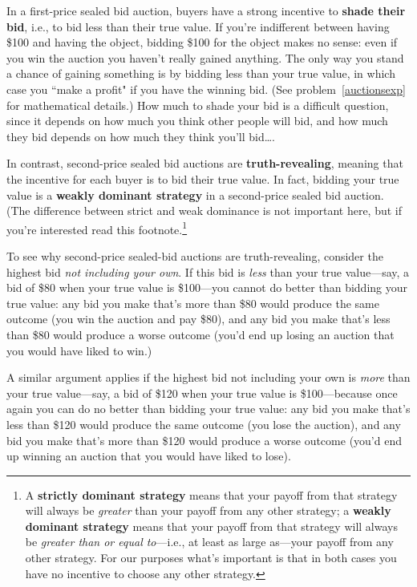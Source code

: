 In a first-price sealed bid auction, buyers have a strong incentive to \textbf{shade their bid}, i.e., to bid less than their true value. If you're indifferent between having \$100 and having the object, bidding \$100 for the object makes no sense: even if you win the auction you haven't really gained anything. The only way you stand a chance of gaining something is by bidding less than your true value, in which case you ``make a profit" if you have the winning bid. (See problem~\ref{auctionsexp} for mathematical details.) How much to shade your bid is a difficult question, since it depends on how much you think other people will bid, and how much they bid depends on how much they think you'll bid\ldots.

In contrast, second-price sealed bid auctions are \textbf{truth-revealing}, meaning that the incentive for each buyer is to bid their true value. In fact, bidding your true value is a \textbf{weakly dominant strategy} in a second-price sealed bid auction. (The difference between strict and weak dominance is not important here, but if you're interested read this footnote.\footnote{A \textbf{strictly dominant strategy} means that your payoff from that strategy will always be \emph{greater} than your payoff from any other strategy; a \textbf{weakly dominant strategy} means that your payoff from that strategy will always be \emph{greater than or equal to}---i.e., at least as large as---your payoff from any other strategy. For our purposes what's important is that in both cases you have no incentive to choose any other strategy.}

To see why second-price sealed-bid auctions are truth-revealing, consider the highest bid \emph{not including your own}. If this bid is \emph{less} than your true value---say, a bid of \$80 when your true value is \$100---you cannot do better than bidding your true value: any bid you make that's more than \$80 would produce the same outcome (you win the auction and pay \$80), and any bid you make that's less than \$80 would produce a worse outcome (you'd end up losing an auction that you would have liked to win.)

A similar argument applies if the highest bid not including your own is \emph{more} than your true value---say, a bid of \$120 when your true value is \$100---because once again you can do no better than bidding your true value: any bid you make that's less than \$120 would produce the same outcome (you lose the auction), and any bid you make that's more than \$120 would produce a worse outcome (you'd end up winning an auction that you would have liked to lose).

